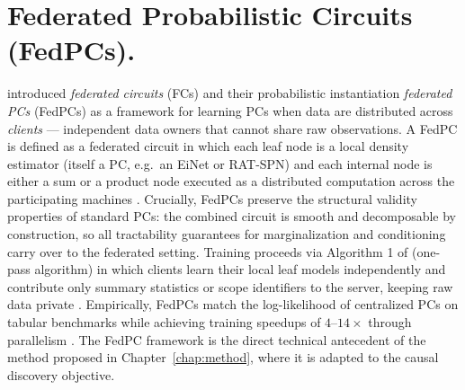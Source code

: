 \section{Federated Probabilistic Circuits (FedPCs).}\label{subsec:fedPCs}
\textcite{Seng2025ScalingPC} introduced \emph{federated circuits} (FCs) and their probabilistic instantiation \emph{federated PCs} (FedPCs) as a framework for learning PCs when data are distributed across \emph{clients} --- independent data owners that cannot share raw
observations.
A FedPC is defined as a federated circuit in which each leaf node is a local density estimator (itself a PC, e.g.\ an EiNet or RAT-SPN) and each internal node is either a sum or a product node executed as a distributed computation across the participating machines \cite{Seng2025ScalingPC}.
Crucially, FedPCs preserve the structural validity properties of standard PCs: the combined circuit is smooth and decomposable by construction, so all tractability guarantees for marginalization and conditioning carry over to the federated setting.
Training proceeds via Algorithm 1 of \textcite{Seng2025ScalingPC} (one-pass algorithm) in which clients learn their local leaf models independently and contribute only summary statistics or scope identifiers to the server, keeping raw data private \cite{Seng2025ScalingPC}.
Empirically, FedPCs match the log-likelihood of centralized PCs on tabular benchmarks while achieving training speedups of $4$--$14\times$ through parallelism \cite{Seng2025ScalingPC}.
The FedPC framework is the direct technical antecedent of the method proposed in Chapter~\ref{chap:method}, where it is adapted to the causal discovery objective.

